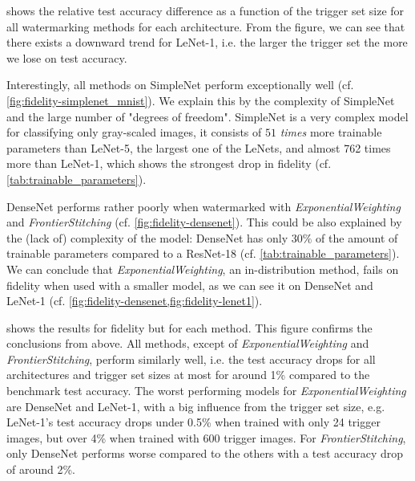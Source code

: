  shows the relative test accuracy difference as a function of the trigger set size for all watermarking methods for each architecture. From the figure, we can see that there exists a downward trend for LeNet-1, i.e. the larger the trigger set the more we lose on test accuracy.

Interestingly, all methods on SimpleNet perform exceptionally well (cf. \cref{fig:fidelity-simplenet_mnist}). We explain this by the complexity of SimpleNet and the large number of "degrees of freedom". SimpleNet is a very complex model for classifying only gray-scaled images, it consists of $51$ \textit{times} more trainable parameters than LeNet-5, the largest one of the LeNets, and almost 762 times more than LeNet-1, which shows the strongest drop in fidelity (cf. \cref{tab:trainable_parameters}).

DenseNet performs rather poorly when watermarked with \textit{ExponentialWeighting} and \textit{FrontierStitching} (cf. \cref{fig:fidelity-densenet}). This could be also explained by the (lack of) complexity of the model: DenseNet has only $30\%$ of the amount of trainable parameters compared to a ResNet-18 (cf. \cref{tab:trainable_parameters}). We can conclude that \textit{ExponentialWeighting}, an in-distribution method, fails on fidelity when used with a smaller model, as we can see it on DenseNet and LeNet-1 (cf. \cref{fig:fidelity-densenet,fig:fidelity-lenet1}).




 shows the results for fidelity but for each method. This figure confirms the conclusions from above. All methods, except of \textit{ExponentialWeighting} and \textit{FrontierStitching}, perform similarly well, i.e. the test accuracy drops for all architectures and trigger set sizes at most for around 1\% compared to the benchmark test accuracy. The worst performing models for \textit{ExponentialWeighting} are DenseNet and LeNet-1, with a big influence from the trigger set size, e.g. LeNet-1's test accuracy drops under 0.5\% when trained with only 24 trigger images, but over 4\% when trained with 600 trigger images. For \textit{FrontierStitching}, only DenseNet performs worse compared to the others with a test accuracy drop of around 2\%.

